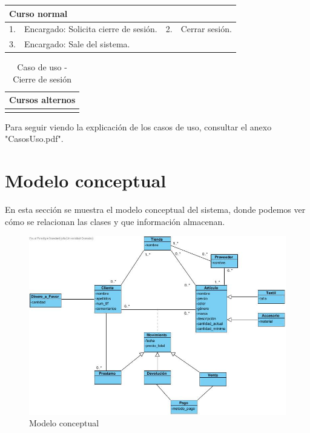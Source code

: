 \begin{table}[H]
	\centering
	\begin{tabular}{| m{} | m{} | m{} | m{} |}
		\hline
		\multicolumn{4}{|m{0.9\textwidth}|}{Curso normal}     \\ 
		\hline
		1. & Encargado: Solicita cierre de sesión. & 2. & Cerrar sesión. \\ 
		\hline
		3. & Encargado: Sale del sistema. &  &  \\ 
		\hline
	\end{tabular}
\end{table}

\begin{table}[H]
	\centering
	\begin{tabular}{| m{} | m{} | m{} | m{} |}
		\hline
		\multicolumn{4}{|m{0.9\textwidth}|}{Cursos alternos}     \\ 
		\hline
		 & \multicolumn{3}{m{0.67\textwidth}|}{} \\ 
		\hline
	\end{tabular}
	\caption{Caso de uso - Cierre de sesión}
\end{table}

Para seguir viendo la explicación de los casos de uso, consultar el anexo "CasosUso.pdf".


\newpage

\section{Modelo conceptual}

En esta sección se muestra el modelo conceptual del sistema, donde podemos ver cómo se relacionan las clases y que información almacenan. 

\begin{figure}[H]
	\centering
	\includegraphics[width=1\textwidth]{imagenes/imagenesDiagramas/modelo_conceptual.jpg}
	\caption{Modelo conceptual}
	\label{fig:modelo_conceptual}
\end{figure}

